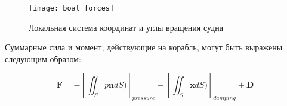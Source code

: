 \begin{figure}[ht]
\begin{center}
\texttt{[image: boat\_forces]}
\end{center}
\caption{Локальная система координат и углы вращения судна}
\label{boat_forces}
\end{figure}

Суммарные сила и момент, действующие на корабль, могут быть выражены следующим образом:

\begin{equation}
	\mathbf{F} = 
		-\left[ \iint_{S} p \mathbf{n} dS ) 		\right]_{pressure}
		-\left[ \iint_{S} \mathbf{x} dS ) 	\right]_{damping}
		+ \mathbf{D}
	\label{F=integral}
\end{equation}

